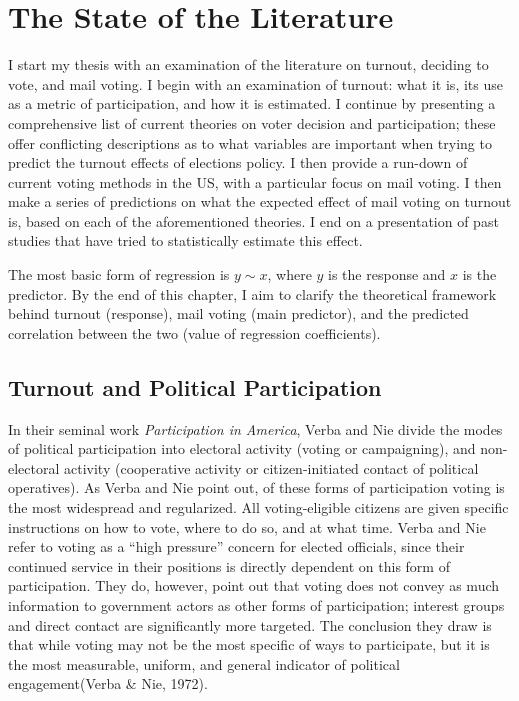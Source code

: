 \documentclass[12pt,twoside]{reedthesis}
\begin{document}
  \chapter{The State of the Literature}\label{rmd-basics}
  
  I start my thesis with an examination of the literature on turnout,
  deciding to vote, and mail voting. I begin with an examination of
  turnout: what it is, its use as a metric of participation, and how it is
  estimated. I continue by presenting a comprehensive list of current
  theories on voter decision and participation; these offer conflicting
  descriptions as to what variables are important when trying to predict
  the turnout effects of elections policy. I then provide a run-down of
  current voting methods in the US, with a particular focus on mail
  voting. I then make a series of predictions on what the expected effect
  of mail voting on turnout is, based on each of the aforementioned
  theories. I end on a presentation of past studies that have tried to
  statistically estimate this effect.
  
  The most basic form of regression is \(y\sim x\), where \(y\) is the
  response and \(x\) is the predictor. By the end of this chapter, I aim
  to clarify the theoretical framework behind turnout (response), mail
  voting (main predictor), and the predicted correlation between the two
  (value of regression coefficients).
  
  \section{Turnout and Political
  Participation}\label{turnout-and-political-participation}
  
  In their seminal work \emph{Participation in America}, Verba and Nie
  divide the modes of political participation into electoral activity
  (voting or campaigning), and non-electoral activity (cooperative
  activity or citizen-initiated contact of political operatives). As Verba
  and Nie point out, of these forms of participation voting is the most
  widespread and regularized. All voting-eligible citizens are given
  specific instructions on how to vote, where to do so, and at what time.
  Verba and Nie refer to voting as a ``high pressure'' concern for elected
  officials, since their continued service in their positions is directly
  dependent on this form of participation. They do, however, point out
  that voting does not convey as much information to government actors as
  other forms of participation; interest groups and direct contact are
  significantly more targeted. The conclusion they draw is that while
  voting may not be the most specific of ways to participate, but it is
  the most measurable, uniform, and general indicator of political
  engagement(Verba \& Nie, 1972).
  
\end{document}
